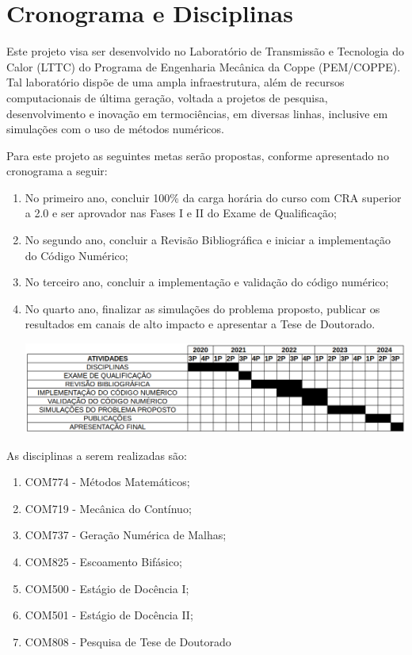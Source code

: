 \section{Cronograma e Disciplinas}

Este projeto visa ser desenvolvido no Laboratório de Transmissão e Tecnologia do Calor (LTTC) do Programa de Engenharia Mecânica da Coppe (PEM/COPPE). 
Tal laboratório dispõe de uma ampla infraestrutura, 
além de recursos computacionais de última geração, 
voltada a projetos de pesquisa, desenvolvimento e inovação
em termociências, em diversas linhas, 
inclusive em simulações com o uso de métodos numéricos. 

\medskip
Para este projeto as seguintes metas serão propostas, conforme apresentado no cronograma a seguir:

\begin{enumerate}

\item No primeiro ano, concluir 100\% da carga horária do curso com CRA superior a 2.0 e ser aprovador nas Fases I e II do Exame de Qualificação;

\item No segundo ano, concluir a Revisão Bibliográfica e iniciar a implementação do Código Numérico;

\item No terceiro ano, concluir a implementação e validação do código numérico;

\item No quarto ano, finalizar as simulações do problema proposto, publicar os resultados em canais de alto impacto e apresentar a Tese de Doutorado.

\hspace{-1.2cm}
\includegraphics[scale=0.44]{figure/cronograma.png}

\end{enumerate}

\medskip
As disciplinas a serem realizadas são:

\begin{enumerate}
\item COM774 - Métodos Matemáticos; 
\item COM719 - Mecânica do Contínuo;
\item COM737 - Geração Numérica de Malhas;
\item COM825 - Escoamento Bifásico;
\item COM500 - Estágio de Docência I;
\item COM501 - Estágio de Docência II;
\item COM808 - Pesquisa de Tese de Doutorado
\end{enumerate}
